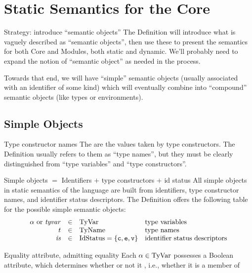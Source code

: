 \chapter{Static Semantics for the Core}

\begin{remark}{Strategy: introduce ``semantic objects''}
The Definition will introduce what is vaguely described as ``semantic
objects'', then use these to present the semantics for both Core and
Modules, both static and dynamic. We'll probably need to expand the
notion of ``semantic object'' as needed in the process.

Towards that end, we will have ``simple'' semantic objects (usually
associated with an identifier of some kind) which will
eventually combine into ``compound'' semantic objects (like types or
environments). 
\end{remark}

\section{Simple Objects}

\begin{definition}{Type constructor names}
The  are the values taken by type
constructors. The Definition usually refers to them as ``type names'',
but they must be clearly distinguished from ``type variables'' and
``type constructors''.
\end{definition}

\begin{clause}{Simple objects $=$ Identifiers $+$ type constructors $+$ id status}
All simple objects in static semantics of the language are built from
identifiers, type constructor names, and identifier status
descriptors. The Definition offers the following table for the possible
simple semantic objects:
\begin{equation*}
\begin{array}{rcll}
\alpha\ {\rm or}\ \textit{tyvar\/} & \in   & {\rm TyVar}       & \mbox{type variables}\\
t                & \in   & {\rm TyName}     & \mbox{type names}\\
\textit{is\/}              & \in   & \hbox{\rm IdStatus} = \{\hbox{\tt c},\hbox{\tt e},\hbox{\tt v}\}    & \mbox{identifier status descriptors}
\end{array}
\end{equation*}
\end{clause}

\begin{definition}{Equality attribute, admitting equality}
Each $\alpha\in{\rm TyVar}$ possesses a Boolean  attribute,
which determines whether or not it , i.e.,
whether it is a member of \EtyVar{} 
\end{definition}

